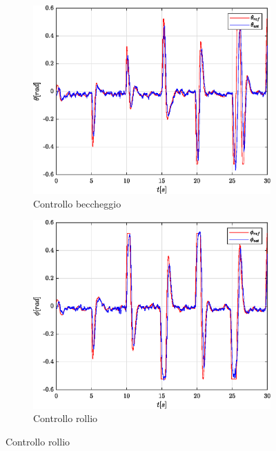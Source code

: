 \begin{figure}
	\centering
	\begin{subfigure}{0.45\textwidth}
		\centering
		\includegraphics[width=1\textwidth]{Simulazioni/Figure/SMC/BUTTERFLY/AttitudeControlPitch}
		\caption{Controllo beccheggio}
		\label{fig:BUTTERFLYbecSMC}
	\end{subfigure}
	\hfill
	\begin{subfigure}{0.45\textwidth}
		\centering
		\includegraphics[width=1\textwidth]{Simulazioni/Figure/SMC/BUTTERFLY/AttitudeControlRoll}
		\caption{Controllo rollio}
		\label{fig:BUTTERFLYrolSMC}
	\end{subfigure}

\end{figure}
